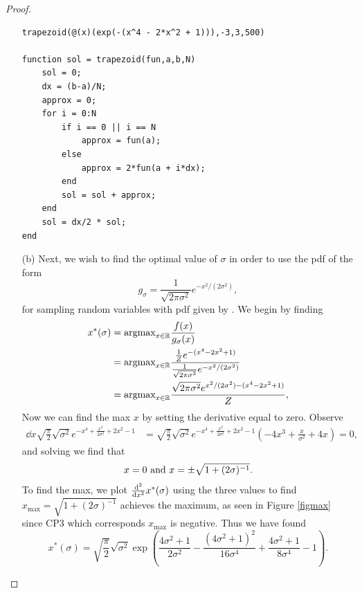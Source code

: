 \documentclass[12pt]{report}
\begin{document}
\begin{problem}
\begin{proof}
\begin{enumerate}
    \begin{lstlisting}[style=Matlab-editor]
trapezoid(@(x)(exp(-(x^4 - 2*x^2 + 1))),-3,3,500)

function sol = trapezoid(fun,a,b,N)
    sol = 0;
    dx = (b-a)/N;
    approx = 0;
    for i = 0:N
        if i == 0 || i == N
            approx = fun(a);
        else
            approx = 2*fun(a + i*dx);
        end
        sol = sol + approx;
    end
    sol = dx/2 * sol;
end
    \end{lstlisting}

    \item [(b)]
    Next, we wish to find the optimal value of $\sigma$ in order to use the pdf of the form
    \begin{equation*}
        g_\sigma = \frac{1}{\sqrt{2\pi \sigma^2}}e^{-x^2/(2\sigma^2)},
    \end{equation*}
    for sampling random variables with pdf given by . We begin by finding
    \begin{align*}
        x^*(\sigma) &= \text{argmax}_{x \in {\mathbb R}} \frac{f(x)}{g_\sigma(x)}\\
        &=  \text{argmax}_{x \in {\mathbb R}} \frac{\frac{1}{Z} e^{-(x^4 - 2x^2 + 1)}}{\frac{1}{\sqrt{2\pi \sigma^2}}e^{-x^2/(2\sigma^2)}}\\
        &=  \text{argmax}_{x \in {\mathbb R}} \frac{ \sqrt{2\pi \sigma^2 }e^{x^2/(2\sigma^2)-(x^4 - 2x^2 + 1)}}{Z},
    \end{align*}
    Now we can find the max $x$ by setting the derivative equal to zero. Observe
    \begin{align*}
        \dd{}{x} \sqrt{\frac{\pi }{2}} \sqrt{\sigma ^2} e^{-x^4+\frac{x^2}{2 \sigma ^2}+2 x^2-1} &= \sqrt{\frac{\pi }{2}} \sqrt{\sigma ^2} e^{-x^4+\frac{x^2}{2 \sigma ^2}+2 x^2-1} \left(-4 x^3+\frac{x}{\sigma ^2}+4 x\right) = 0,
    \end{align*}
    and solving we find that
    \begin{equation*}
        x = 0 {~\text{and}~} x = \pm \sqrt{1 + (2\sigma)^{-1}}.
    \end{equation*}
    To find the max, we plot $\frac{\mathrm{d}^{2} }{\mathrm{d} x^{2}}x^*(\sigma)$ using the three values to find $x_{\text{max}} = \sqrt{1 + (2\sigma)^{-1}}$ achieves the maximum, as seen in Figure \ref{figmax} since CP3 which corresponds $x_{\text{max}}$ is negative. Thus we have found
    \begin{equation*}
        x^*(\sigma) = \sqrt{\frac{\pi }{2}} \sqrt{\sigma ^2} \exp \left(\frac{4 \sigma ^2+1}{2 \sigma ^2}-\frac{\left(4 \sigma ^2+1\right)^2}{16 \sigma ^4}+\frac{4 \sigma ^2+1}{8 \sigma ^4}-1\right).

\end{equation*}
\end{enumerate}
\end{proof}
\end{problem}
\end{document}
